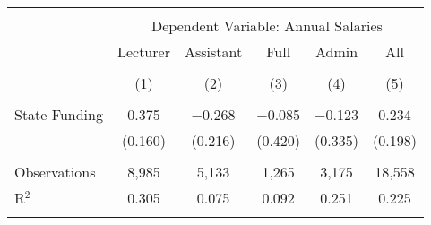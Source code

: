 
\begin{tabular}{@{\extracolsep{5pt}}lccccc} 
\\[-1.8ex]\hline 
\hline \\[-1.8ex] 
 & \multicolumn{5}{c}{Dependent Variable: Annual Salaries} \\ 
\cline{2-6} 
 & Lecturer & Assistant & Full & Admin & All \\ 
\\[-1.8ex] & (1) & (2) & (3) & (4) & (5)\\ 
\hline \\[-1.8ex] 
 State Funding & 0.375 & $-$0.268 & $-$0.085 & $-$0.123 & 0.234 \\ 
  & (0.160) & (0.216) & (0.420) & (0.335) & (0.198) \\ 
 \hline \\[-1.8ex] 
Observations & 8,985 & 5,133 & 1,265 & 3,175 & 18,558 \\ 
R$^{2}$ & 0.305 & 0.075 & 0.092 & 0.251 & 0.225 \\ 
\hline 
\hline \\[-1.8ex] 
\end{tabular} 
